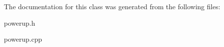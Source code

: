 The documentation for this class was generated from the following files\+:\begin{DoxyCompactItemize}
\item 
powerup.\+h\item 
powerup.\+cpp\end{DoxyCompactItemize}
